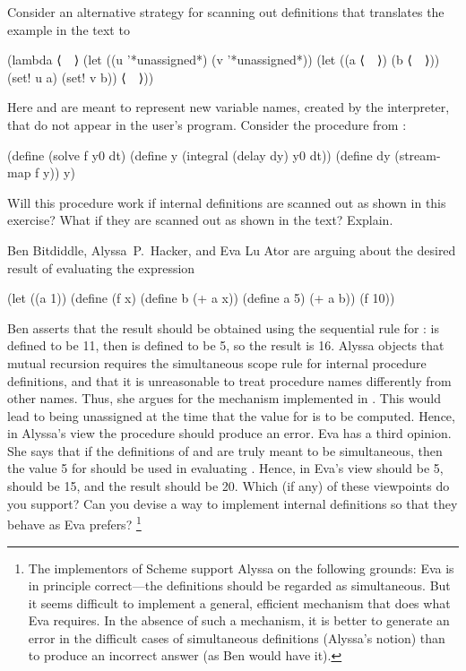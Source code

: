 \begin{exercise}
	\label{Exercise 4.18} Consider an alternative strategy for scanning out definitions that translates the example in the text to
	\begin{scheme}
	  (lambda ⟨~~⟩
	    (let ((u '*unassigned*) (v '*unassigned*))
	      (let ((a ⟨~~⟩) (b ⟨~~⟩))
	        (set! u a)
	        (set! v b))
	      ⟨~~⟩))
	\end{scheme}
	Here  and  are meant to represent new variable names, created by the interpreter, that do not appear in the user’s program.
	Consider the  procedure from \link{Section 3.5.4}:
	\begin{scheme}
	  (define (solve f y0 dt)
	    (define  y (integral (delay dy) y0 dt))
	    (define dy (stream-map f y))
	    y)
	\end{scheme}
	Will this procedure work if internal definitions are scanned out as shown in this exercise?
	What if they are scanned out as shown in the text?
	Explain.
\end{exercise}



\begin{exercise}
	\label{Exercise 4.19}
	Ben Bitdiddle, Alyssa~P.~Hacker, and Eva Lu Ator are arguing about the desired result of evaluating the expression
	\begin{scheme}
	  (let ((a 1))
	    (define (f x)
	      (define b (+ a x))
	      (define a 5)
	      (+ a b))
	    (f 10))
	\end{scheme}
	Ben asserts that the result should be obtained using the sequential rule for :
	 is defined to be 11, then  is defined to be 5, so the result is 16.
	Alyssa objects that mutual recursion requires the simultaneous scope rule for internal procedure definitions, and that it is unreasonable to treat procedure names differently from other names.
	Thus, she argues for the mechanism implemented in .
	This would lead to  being unassigned at the time that the value for  is to be computed.
	Hence, in Alyssa’s view the procedure should produce an error.
	Eva has a third opinion.
	She says that if the definitions of  and  are truly meant to be simultaneous, then the value 5 for  should be used in evaluating .
	Hence, in Eva’s view  should be 5,  should be 15, and the result should be 20.
	Which (if any) of these viewpoints do you support?
	Can you devise a way to implement internal definitions so that they behave as Eva prefers?%
	\footnote{
		The  implementors of Scheme support Alyssa on the following grounds:
		Eva is in principle correct---the definitions should be regarded as simultaneous.
		But it seems difficult to implement a general, efficient mechanism that does what Eva requires.
		In the absence of such a mechanism, it is better to generate an error in the difficult cases of simultaneous definitions (Alyssa’s notion) than to produce an incorrect answer (as Ben would have it).
	}
\end{exercise}



